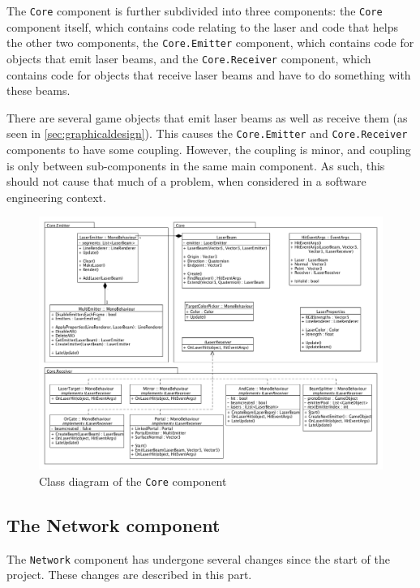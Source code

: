 			The \texttt{Core} component is further subdivided into three components:
			the \texttt{Core} component itself, which contains code relating to the laser
			and code that helps the other two components, the 
			\texttt{Core.Emitter} component, which contains code for objects 
			that emit laser beams, and the \texttt{Core.Receiver} component, 
			which contains code for objects that receive laser beams and have to 
			do something with these beams.
			
			There are several game objects that emit laser beams as well as 
			receive them (as seen in \ref{sec:graphicaldesign}). This causes the
			\texttt{Core.Emitter} and \texttt{Core.Receiver} components to have 
			some coupling. However, the coupling is minor, and coupling is only 
			between sub-components in the same main component. As such, this 
			should not cause that much of a problem, when considered in a 
			software engineering context.
			
			\begin{figure}[ht]
				\includegraphics[width=\textwidth]{ClassDiagramCore}
				\caption{Class diagram of the \texttt{Core} component}
				\label{fig:classdiagramcore}
			\end{figure}
			
		\subsection{The Network component} \label{ssec:networkcomponent}
			The \texttt{Network} component has undergone several changes since the start
			of the project. These changes are described in this part.
			
